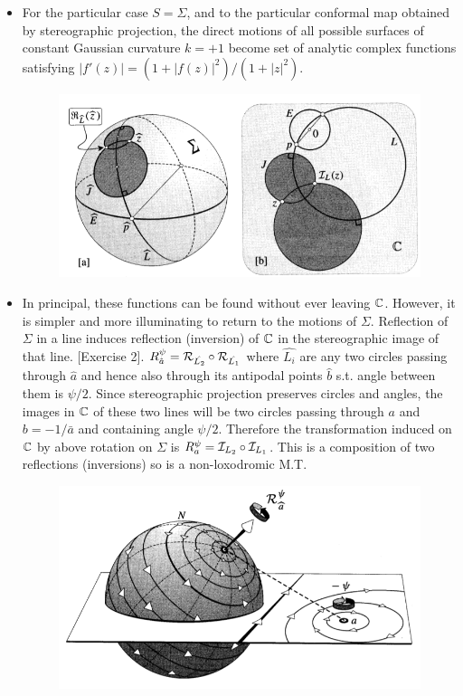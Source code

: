 \documentclass[12pt]{article}
\def\mc{\ensuremath\mathcal}
\def\mb{\ensuremath\mathbb}
\def\C{\ensuremath\mb{C}}
\begin{document}
\begin{itemize}
    \item For the particular case $S=\Sigma$, and to the particular conformal map obtained by stereographic projection, the direct motions of all possible surfaces of constant Gaussian curvature $k=+1$ become set of analytic complex functions satisfying $|f'(z)| = (1+|f(z)|^2)/(1+|z|^2)$.

    \begin{figure}[h!]
        \centering
        \includegraphics[scale=0.7]{fig_9}
        \label{fig_9}
    \end{figure}

    \item In principal, these functions can be found without ever leaving $\C$. However, it is simpler and more illuminating to return to the motions of $\Sigma$. Reflection of $\Sigma $ in a line induces reflection (inversion) of $\C$ in the stereographic image of that line. [Exercise 2]. $R^{\psi}_{\hat{a}} = \mc{R}_{\hat{L_2}} \circ \mc{R}_{\hat{L_1}}$ where $\hat{L_i}$ are any two circles passing through $\hat{a}$ and hence also through its antipodal points $\hat{b}$ s.t. angle between them is $\psi/2$. Since stereographic projection preserves circles and angles, the images in $\C$ of these two lines will be two circles passing through $a$ and $b=-1/\bar{a}$ and containing angle $\psi/2$. Therefore the transformation induced on $\C$ by above rotation on $\Sigma$ is $R_{a}^{\psi} = \mc{I}_{L_2} \circ \mc{I}_{L_1}$. This is a composition of two reflections (inversions) so is a non-loxodromic M.T.
    
    \begin{figure}[h!]
        \centering
        \includegraphics[scale=0.7]{fig_10}
        \label{fig_10}
    \end{figure}


\end{itemize}
\end{document}
